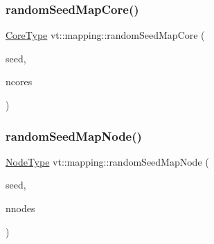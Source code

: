 \mbox{\label{namespacevt_1_1mapping_a35fdd9ccfcee759a8c0ba29b5c61d2a5}} 
\subsubsection{\texorpdfstring{random\+Seed\+Map\+Core()}{randomSeedMapCore()}}
{\footnotesize\ttfamily \hyperlink{namespacevt_a74b11b22c02feaabab8591acc87c7c52}{Core\+Type} vt\+::mapping\+::random\+Seed\+Map\+Core (\begin{DoxyParamCaption}\item[{\hyperlink{namespacevt_ae2e13198bdef4d5b8e603d6c1c7f0969}{Seed\+Type}}]{seed,  }\item[{\hyperlink{namespacevt_a74b11b22c02feaabab8591acc87c7c52}{Core\+Type}}]{ncores }\end{DoxyParamCaption})}

\mbox{\label{namespacevt_1_1mapping_accca64daff113b58cd733710ab4e0854}} 
\subsubsection{\texorpdfstring{random\+Seed\+Map\+Node()}{randomSeedMapNode()}}
{\footnotesize\ttfamily \hyperlink{namespacevt_a866da9d0efc19c0a1ce79e9e492f47e2}{Node\+Type} vt\+::mapping\+::random\+Seed\+Map\+Node (\begin{DoxyParamCaption}\item[{\hyperlink{namespacevt_ae2e13198bdef4d5b8e603d6c1c7f0969}{Seed\+Type}}]{seed,  }\item[{\hyperlink{namespacevt_a866da9d0efc19c0a1ce79e9e492f47e2}{Node\+Type}}]{nnodes }\end{DoxyParamCaption})}

